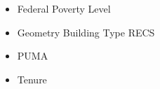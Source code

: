 \begin{itemize}
\item Federal Poverty Level
\item Geometry Building Type RECS
\item PUMA
\item Tenure
\end{itemize}
